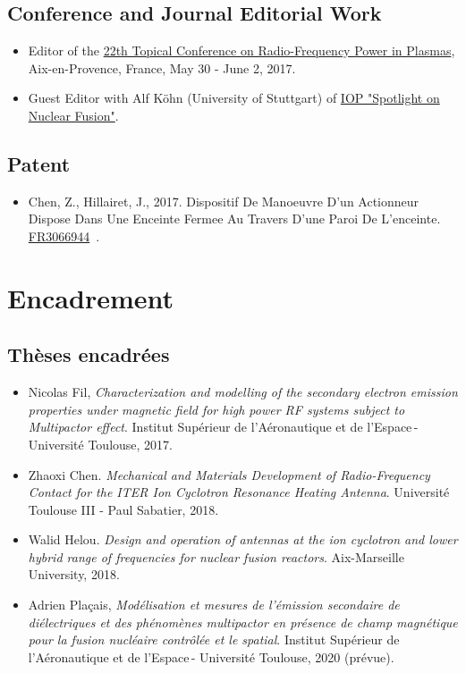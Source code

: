 \documentclass[
fontsize=10pt, %
twoside=true, %
numbers=noenddot, %
]{kaobook}
\begin{document}
	\section*{Conference and Journal Editorial Work}
	\begin{itemize}
		\item Editor of the \href{https://www.epj-conferences.org/articles/epjconf/abs/2017/26/contents/contents.html}{22th Topical Conference on Radio-Frequency Power in Plasmas}, Aix-en-Provence, France, May 30 - June 2, 2017.
		\item Guest Editor with Alf Köhn (University of Stuttgart) of \href{https://iopscience.iop.org/journal/0031-9120/page/Spotlight-on-Nuclear-Fusion}{IOP "Spotlight on Nuclear Fusion"}.
	\end{itemize}
	
	\section*{Patent}

	\begin{itemize}
		\item Chen, Z., Hillairet, J., 2017. Dispositif De Manoeuvre D’un Actionneur Dispose Dans Une Enceinte Fermee Au Travers D’une Paroi De L’enceinte. \href{https://bases-brevets.inpi.fr/fr/document/FR3066944.html?s=1587045453863&p=5&cHash=9dd74066794d8b15bf32b0ef194d0d86}{FR3066944}~\cite{chen2017-4}.
	\end{itemize}
		
	
	\newpage
	\chapter{Encadrement}
	\section*{Thèses encadrées}
	\begin{itemize}
	\item Nicolas Fil, \textit{Characterization and modelling of the secondary electron emission properties under magnetic field for high power RF systems subject to Multipactor effect}. Institut Supérieur de l'Aéronautique et de l'Espace - Université Toulouse, 2017. 
	
	\item Zhaoxi Chen. \textit{Mechanical and Materials Development of Radio-Frequency Contact for the ITER Ion Cyclotron Resonance Heating Antenna}. Université Toulouse III - Paul Sabatier, 2018.
	
	\item Walid Helou. \textit{Design and operation of antennas at the ion cyclotron and lower hybrid range of frequencies for nuclear fusion reactors}. Aix-Marseille University, 2018.

		\item Adrien Plaçais, \textit{Modélisation et mesures de l'émission secondaire de diélectriques et des phénomènes multipactor en présence de champ magnétique pour la fusion nucléaire contrôlée et le spatial}. Institut Supérieur de l'Aéronautique et de l'Espace - Université Toulouse, 2020 (prévue).
	
	\end{itemize}
\end{document}
